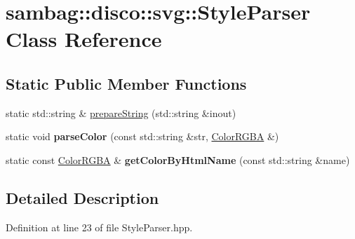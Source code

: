 \hypertarget{classsambag_1_1disco_1_1svg_1_1_style_parser}{
\section{sambag::disco::svg::StyleParser Class Reference}
\label{classsambag_1_1disco_1_1svg_1_1_style_parser}
}
\subsection*{Static Public Member Functions}
\begin{DoxyCompactItemize}
\item 
static std::string \& \hyperlink{classsambag_1_1disco_1_1svg_1_1_style_parser_a7be7fc328824c1c2c5ea36e9978be46f}{prepareString} (std::string \&inout)
\item 
\hypertarget{classsambag_1_1disco_1_1svg_1_1_style_parser_a09d0fec40da8b0a23a34c03f211c6464}{
static void {\bfseries parseColor} (const std::string \&str, \hyperlink{structsambag_1_1com_1_1_color_r_g_b_a}{ColorRGBA} \&)}
\label{classsambag_1_1disco_1_1svg_1_1_style_parser_a09d0fec40da8b0a23a34c03f211c6464}

\item 
\hypertarget{classsambag_1_1disco_1_1svg_1_1_style_parser_a05efaee1ead9727a36ce2442467e9d7b}{
static const \hyperlink{structsambag_1_1com_1_1_color_r_g_b_a}{ColorRGBA} \& {\bfseries getColorByHtmlName} (const std::string \&name)}
\label{classsambag_1_1disco_1_1svg_1_1_style_parser_a05efaee1ead9727a36ce2442467e9d7b}

\end{DoxyCompactItemize}


\subsection{Detailed Description}


Definition at line 23 of file StyleParser.hpp.



